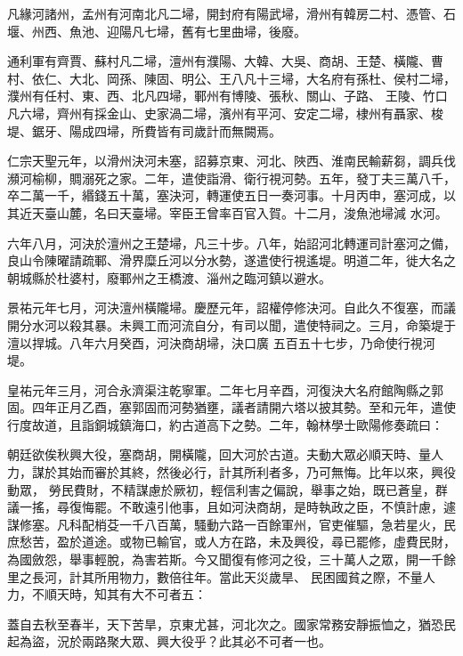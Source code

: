 \begin{pinyinscope}
 凡緣河諸州，孟州有河南北凡二埽，開封府有陽武埽，滑州有韓房二村、憑管、石堰、州西、魚池、迎陽凡七埽，舊有七里曲埽，後廢。



 通利軍有齊賈、蘇村凡二埽，澶州有濮陽、大韓、大吳、商胡、王楚、橫隴、曹村、依仁、大北、岡孫、陳固、明公、王八凡十三埽，大名府有孫杜、侯村二埽，濮州有任村、東、西、北凡四埽，鄆州有博陵、張秋、關山、子路、
 王陵、竹口凡六埽，齊州有採金山、史家渦二埽，濱州有平河、安定二埽，棣州有聶家、梭堤、鋸牙、陽成四埽，所費皆有司歲計而無闕焉。



 仁宗天聖元年，以滑州決河未塞，詔募京東、河北、陜西、淮南民輸薪芻，調兵伐瀕河榆柳，賙溺死之家。二年，遣使詣滑、衛行視河勢。五年，發丁夫三萬八千，卒二萬一千，緡錢五十萬，塞決河，轉運使五日一奏河事。十月丙申，塞河成，以其近天臺山麓，名曰天臺埽。宰臣王曾率百官入賀。十二月，浚魚池埽減
 水河。



 六年八月，河決於澶州之王楚埽，凡三十步。八年，始詔河北轉運司計塞河之備，良山令陳曜請疏鄆、滑界糜丘河以分水勢，遂遣使行視遙堤。明道二年，徙大名之朝城縣於杜婆村，廢鄆州之王橋渡、淄州之臨河鎮以避水。



 景祐元年七月，河決澶州橫隴埽。慶歷元年，詔權停修決河。自此久不復塞，而議開分水河以殺其暴。未興工而河流自分，有司以聞，遣使特祠之。三月，命築堤于澶以捍城。八年六月癸酉，河決商胡埽，決口廣
 五百五十七步，乃命使行視河堤。



 皇祐元年三月，河合永濟渠注乾寧軍。二年七月辛酉，河復決大名府館陶縣之郭固。四年正月乙酉，塞郭固而河勢猶壅，議者請開六塔以披其勢。至和元年，遣使行度故道，且詣銅城鎮海口，約古道高下之勢。二年，翰林學士歐陽修奏疏曰：



 朝廷欲俟秋興大役，塞商胡，開橫隴，回大河於古道。夫動大眾必順天時、量人力，謀於其始而審於其終，然後必行，計其所利者多，乃可無悔。比年以來，興役動眾，
 勞民費財，不精謀慮於厥初，輕信利害之偏說，舉事之始，既已蒼皇，群議一搖，尋復悔罷。不敢遠引他事，且如河決商胡，是時執政之臣，不慎計慮，遽謀修塞。凡科配梢芟一千八百萬，騷動六路一百餘軍州，官吏催驅，急若星火，民庶愁苦，盈於道途。或物已輸官，或人方在路，未及興役，尋已罷修，虛費民財，為國斂怨，舉事輕脫，為害若斯。今又聞復有修河之役，三十萬人之眾，開一千餘里之長河，計其所用物力，數倍往年。當此天災歲旱、
 民困國貧之際，不量人力，不順天時，知其有大不可者五：



 蓋自去秋至春半，天下苦旱，京東尤甚，河北次之。國家常務安靜振恤之，猶恐民起為盜，況於兩路聚大眾、興大役乎？此其必不可者一也。




\end{pinyinscope}
